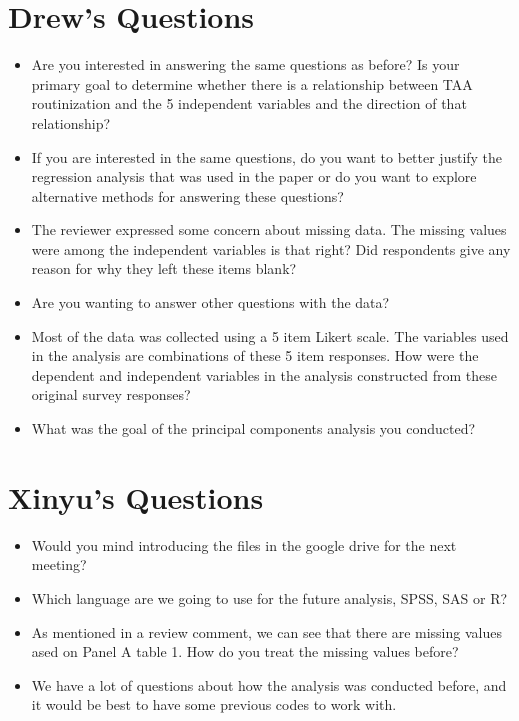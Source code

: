 \section{Drew's Questions}
\begin{itemize}
    \item Are you interested in answering the same questions as before? Is your primary goal to determine whether there is a relationship between TAA routinization and the 5 independent variables and the direction of that relationship?
    \item If you are interested in the same questions, do you want to better justify the regression analysis that was used in the paper or do you want to explore alternative methods for answering these questions?
    \item The reviewer expressed some concern about missing data. The missing values were among the independent variables is that right? Did respondents give any reason for why they left these items blank?
    \item Are you wanting to answer other questions with the data?
    \item Most of the data was collected using a 5 item Likert scale. The variables used in the analysis are combinations of these 5 item responses. How were the dependent and independent variables in the analysis constructed from these original survey responses?
    \item What was the goal of the principal components analysis you conducted?
\end{itemize}


\section{Xinyu's Questions}

\begin{itemize}
    \item Would you mind introducing the files in the google drive for the next meeting?
    \item Which language are we going to use for the future analysis, SPSS, SAS or R?
    \item As mentioned in a review comment, we can see that there are missing values ased on Panel A table 1. How do you treat the missing values before?
    \item We have a lot of questions about how the analysis was conducted before, and it would be best to have some previous codes to work with.
\end{itemize}

